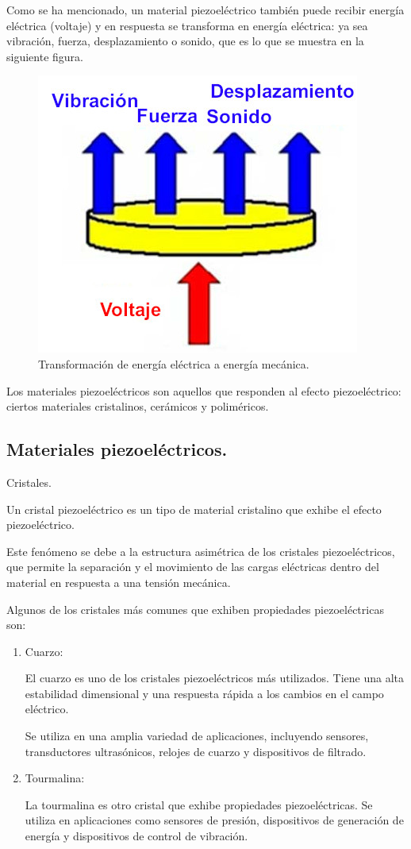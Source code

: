 \documentclass[12pt]{article}
\begin{document}
Como se ha mencionado, un material piezoeléctrico también puede recibir energía eléctrica (voltaje) y en respuesta se transforma en energía eléctrica: ya sea vibración, fuerza, desplazamiento o sonido, que es lo que se muestra en la siguiente figura.
\begin{figure}[H]
    \centering
    \includegraphics[scale=0.5]{Imagenes/Piezoelectricidad_04c.jpg}
    \caption{Transformación de energía eléctrica a energía mecánica.}
\end{figure}

Los materiales piezoeléctricos son aquellos que responden al efecto piezoeléctrico: ciertos materiales cristalinos, cerámicos y poliméricos.


\subsection{Materiales piezoeléctricos.}

Cristales.

\vspace{0.3cm}
Un cristal piezoeléctrico es un tipo de material cristalino que exhibe el efecto piezoeléctrico.

Este fenómeno se debe a la estructura asimétrica de los cristales piezoeléctricos, que permite la separación y el movimiento de las cargas eléctricas dentro del material en respuesta a una tensión mecánica.

Algunos de los cristales más comunes que exhiben propiedades piezoeléctricas son:
\begin{enumerate}
\item Cuarzo:

El cuarzo es uno de los cristales piezoeléctricos más utilizados. Tiene una alta estabilidad dimensional y una respuesta rápida a los cambios en el campo eléctrico.

Se utiliza en una amplia variedad de aplicaciones, incluyendo sensores, transductores ultrasónicos, relojes de cuarzo y dispositivos de filtrado.
\item Tourmalina:

La tourmalina es otro cristal que exhibe propiedades piezoeléctricas. Se utiliza en aplicaciones como sensores de presión, dispositivos de generación de energía y dispositivos de control de vibración.
\end{enumerate}
\end{document}
